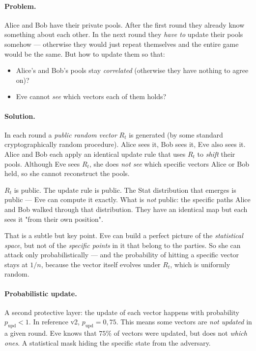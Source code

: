 \documentclass[11pt,a4paper]{article}
\begin{document}
\paragraph{Problem.} Alice and Bob have their private pools. After the first round they already know something about each other. In the next round they \emph{have to} update their pools somehow --- otherwise they would just repeat themselves and the entire game would be the same. But how to update them so that:
\begin{itemize}[leftmargin=*]
\item Alice's and Bob's pools stay \emph{correlated} (otherwise they have nothing to agree on)?
\item Eve cannot \emph{see} which vectors each of them holds?
\end{itemize}

\paragraph{Solution.} In each round a \emph{public random vector} $R_t$ is generated (by some standard cryptographically random procedure). Alice sees it, Bob sees it, Eve also sees it. Alice and Bob each apply an identical update rule that uses $R_t$ to \emph{shift} their pools. Although Eve sees $R_t$, she does \emph{not see} which specific vectors Alice or Bob held, so she cannot reconstruct the pools.

\begin{aha}
$R_t$ is public. The update rule is public. The Stat distribution that emerges is public --- Eve can compute it exactly. What is \emph{not} public: the specific paths Alice and Bob walked through that distribution. They have an identical map but each sees it "from their own position".
\end{aha}

That is a subtle but key point. Eve can build a perfect picture of the \emph{statistical space}, but not of the \emph{specific points} in it that belong to the parties. So she can attack only probabilistically --- and the probability of hitting a specific vector stays at $1/n$, because the vector itself evolves under $R_t$, which is uniformly random.

\paragraph{Probabilistic update.} A second protective layer: the update of each vector happens with probability $p_\text{upd} < 1$. In reference v2, $p_\text{upd} = 0{,}75$. This means some vectors are \emph{not updated} in a given round. Eve knows that $75\%$ of vectors were updated, but does not \emph{which ones}. A statistical mask hiding the specific state from the adversary.
\end{document}
